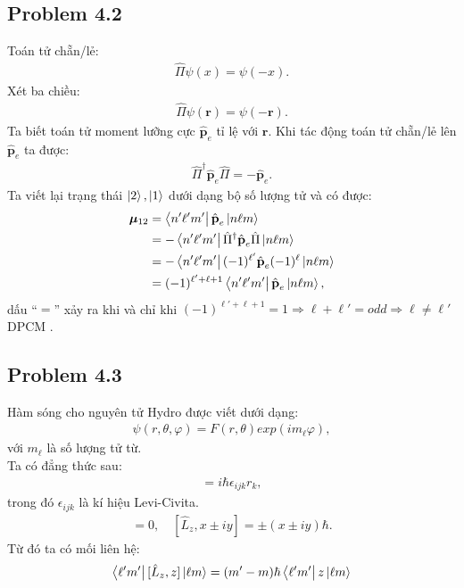 \documentclass{article}
\renewcommand{\l}{\ell}
\begin{document}
\subsection{Problem 4.2}
Toán tử chẵn/lẻ:
\begin{align*}
	\hat{\Pi} \psi(x) = \psi(-x).
\end{align*}
Xét ba chiều:
\begin{align*}
	\hat{\Pi} \psi(\mathbf{r}) = \psi(-\mathbf{r}).
\end{align*}
Ta biết toán tử moment lưỡng cực $\hat{\textbf{p}}_e$ tỉ lệ với $\mathbf{r}$. Khi tác động toán tử chẵn/lẻ lên $\hat{\textbf{p}}_e$ ta được:
\begin{align*}
	\hat{\Pi}^{\dagger} \hat{\textbf{p}}_e \hat{\Pi} = - \hat{\textbf{p}}_e.
\end{align*}
Ta viết lại trạng thái $\ket{2},\ket{1}$ dưới dạng bộ số lượng tử và có được:
\begin{align*}
	\boldsymbol{\mu}_{12}
	 & = \bra{n'\l'm'} \hat{\textbf{p}}_e \ket{n\l m}                                   \\
	 & =  - \bra{n'\l'm'}  \hat{\Pi}^{\dagger} \hat{\textbf{p}}_e \hat{\Pi} \ket{n\l m} \\
	 & =  - \bra{n'\l'm'}  (-1)^{\l'} \hat{\textbf{p}}_e (-1)^{\l} \ket{n\l m} \\
	 & =  (-1)^{\l' + \l + 1} \bra{n'\l'm'}   \hat{\textbf{p}}_e \ket{n\l m}, \\
\end{align*}
dấu ``$=$'' xảy ra khi và chỉ khi $ (-1)^{\l' + \l + 1} = 1 \Rightarrow \l + \l' = odd \Rightarrow \l \neq \l'$ DPCM .

\subsection{Problem 4.3}
Hàm sóng cho nguyên tử Hydro được viết dưới dạng:
\begin{align*}
	\psi (r,\theta,\varphi) = F(r,\theta) exp(i m_{\l} \varphi ),
\end{align*}
với $ m_{\l}$ là số lượng tử từ.\\
Ta có đẳng thức sau:
\begin{align*}
	[ \hat{L}_i, r_i ] = i\hbar \epsilon_{ijk} r_{k},
\end{align*}
trong đó $\epsilon_{ijk}$ là kí hiệu Levi-Civita.
\begin{align*}
	[ \hat{L}_z, z ] = 0, \quad
	[ \hat{L}_z, x \pm iy ] = \pm (x \pm iy)\hbar.
\end{align*}
Từ đó ta có mối liên hệ:
\begin{align*}
	\bra{\l'm'} [ \hat{L}_z, z ] \ket{\l m} = (m' - m) \hbar \bra{\l'm'} z \ket{\l m}
\end{align*}
\end{document}
